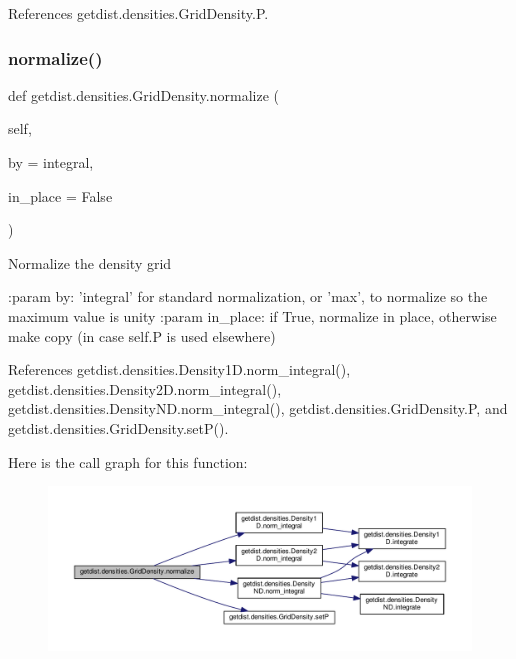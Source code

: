 References getdist.\+densities.\+Grid\+Density.\+P.

\mbox{\label{classgetdist_1_1densities_1_1GridDensity_ae3624f9061f1aa6d8ff480e08924f15e}} 
\subsubsection{\texorpdfstring{normalize()}{normalize()}}
{\footnotesize\ttfamily def getdist.\+densities.\+Grid\+Density.\+normalize (\begin{DoxyParamCaption}\item[{}]{self,  }\item[{}]{by = {\ttfamily \textquotesingle{}integral\textquotesingle{}},  }\item[{}]{in\+\_\+place = {\ttfamily False} }\end{DoxyParamCaption})}

\begin{DoxyVerb}Normalize the density grid

:param by: 'integral' for standard normalization, or 'max', to normalize so the maximum value is unity
:param in_place: if True, normalize in place, otherwise make copy (in case self.P is used elsewhere)
\end{DoxyVerb}
 

References getdist.\+densities.\+Density1\+D.\+norm\+\_\+integral(), getdist.\+densities.\+Density2\+D.\+norm\+\_\+integral(), getdist.\+densities.\+Density\+N\+D.\+norm\+\_\+integral(), getdist.\+densities.\+Grid\+Density.\+P, and getdist.\+densities.\+Grid\+Density.\+set\+P().

Here is the call graph for this function\+:
\nopagebreak
\begin{figure}[H]
\begin{center}
\leavevmode
\includegraphics[width=350pt]{classgetdist_1_1densities_1_1GridDensity_ae3624f9061f1aa6d8ff480e08924f15e_cgraph}
\end{center}
\end{figure}
\mbox{\label{classgetdist_1_1densities_1_1GridDensity_a846e4c6346b0b839fbec49eab7570b3e}} 
